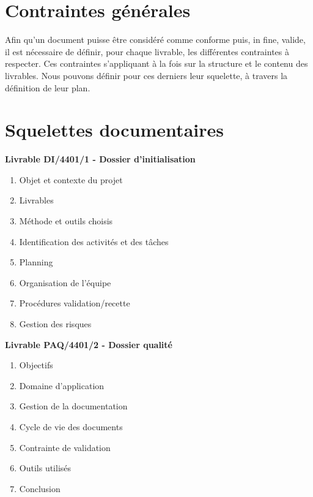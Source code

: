 \section{Contraintes générales}

Afin qu’un document puisse être considéré comme conforme puis, in fine, valide, il est nécessaire de définir, pour chaque livrable, les différentes contraintes à respecter. Ces contraintes s’appliquant à la fois sur la structure et le contenu des livrables. Nous pouvons définir pour ces derniers leur squelette, à travers la définition de leur plan.

\section{Squelettes documentaires}

\bf{Livrable DI/4401/1 - Dossier d’initialisation} \\

\begin{enumerate}
    \item Objet et contexte du projet
    \item Livrables
    \item Méthode et outils choisis
    \item Identification des activités et des tâches
    \item Planning
    \item Organisation de l’équipe
    \item Procédures validation/recette
    \item Gestion des risques \\
\end{enumerate}

\bf{Livrable PAQ/4401/2 - Dossier qualité} \\

\begin{enumerate}
    \item Objectifs
    \item Domaine d'application
    \item Gestion de la documentation
    \item Cycle de vie des documents
    \item Contrainte de validation 
    \item Outils utilisés
    \item Conclusion \\
\end{enumerate}

